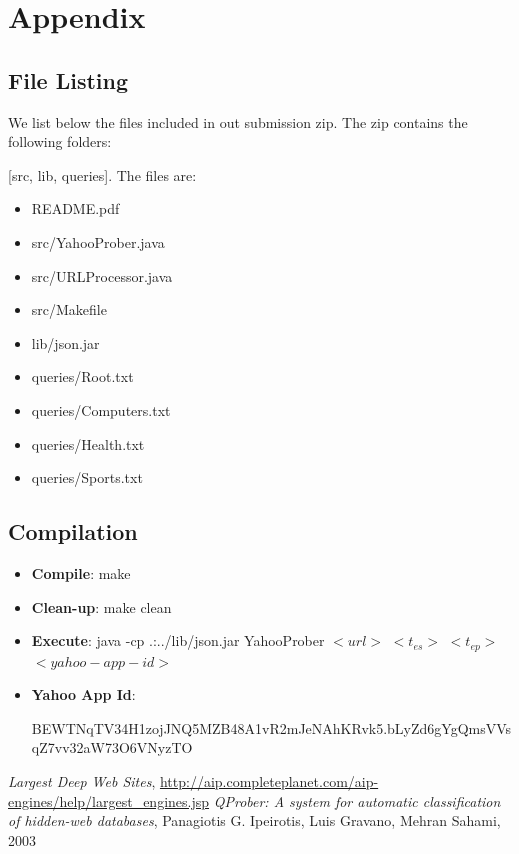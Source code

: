 \documentclass[11pt]{article}
\begin{document}
\section* {Appendix}

\subsection* {File Listing}

We list below the files included in out submission zip. The zip contains the following folders:

[src, lib, queries].
The files are:
\begin{itemize}
\item README.pdf
\item src/YahooProber.java
\item src/URLProcessor.java
\item src/Makefile
\item lib/json.jar
\item queries/Root.txt
\item queries/Computers.txt
\item queries/Health.txt
\item queries/Sports.txt
\end{itemize}

\subsection* {Compilation}
\begin{itemize}
\item \textbf{Compile}: make 
\item \textbf{Clean-up}: make clean 
\item\textbf{Execute}: java -cp .:../lib/json.jar  YahooProber $<url>$ $<t_{es}>$ $<t_{ep}>$ $<yahoo-app-id>$
\item \textbf{Yahoo App Id}: 

BEWTNqTV34H1zojJNQ5MZB48A1vR2mJeNAhKRvk5.bLyZd6gYgQmsVVsqZ7vv32aW73O6VNyzTO
\end{itemize}


\begin{thebibliography}{50}
		 \textit{Largest Deep Web Sites}, \url{http://aip.completeplanet.com/aip-engines/help/largest_engines.jsp}
		 \textit{QProber: A system for automatic classification of hidden-web databases}, Panagiotis G. Ipeirotis,  Luis Gravano,  Mehran Sahami, 2003
\end{thebibliography}
\end{document}
